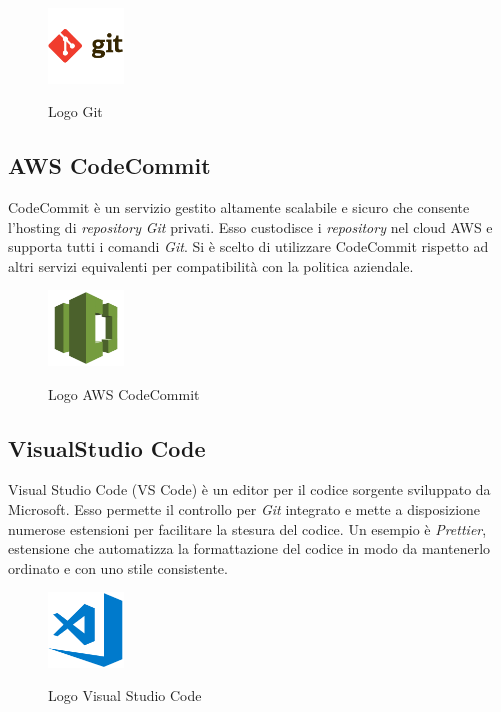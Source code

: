 	\begin{figure}[H]
		\centering
		\includegraphics[width=2cm]{immagini/git.png} \\
		\caption{\label{fig:logo_git} Logo Git}
	\end{figure}

	\subsection{AWS CodeCommit}
	CodeCommit è un servizio gestito altamente scalabile e sicuro che consente l'hosting di \emph{repository} \emph{Git} privati. Esso custodisce i \emph{repository} nel cloud \gls{AWS} e supporta tutti i comandi \emph{Git}. Si è scelto di utilizzare CodeCommit rispetto ad altri servizi equivalenti per compatibilità con la politica aziendale.
	
	\begin{figure}[H]
		\centering
		\includegraphics[width=2cm]{immagini/codecommit.png} \\
		\caption{\label{fig:logo_codecommit} Logo AWS CodeCommit}
	\end{figure}

	\subsection{VisualStudio Code}
	Visual Studio Code (VS Code) è un editor per il codice sorgente sviluppato da Microsoft. Esso permette il controllo per \emph{Git} integrato e mette a disposizione numerose estensioni per facilitare la stesura del codice. Un esempio è \emph{Prettier}, estensione che automatizza la formattazione del codice in modo da mantenerlo ordinato e con uno stile consistente.
	
	\begin{figure}[H]
		\centering
		\includegraphics[width=2cm]{immagini/visual-studio-code.png} \\
		\caption{\label{fig:logo_vscode} Logo Visual Studio Code}
	\end{figure}

